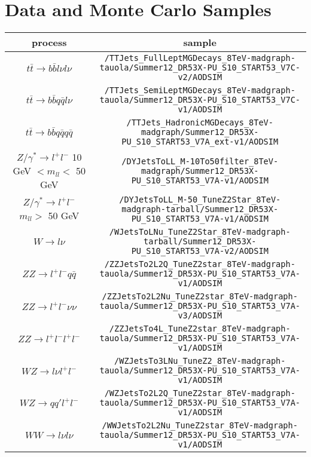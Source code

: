 \chapter{Data and Monte Carlo Samples}


\begin{sidewaystable} 
\small
\begin{tabular}{c|c}
 process & sample \\
\hline 
$t\bar{t} \rightarrow b\bar{b}l\nu l\nu$ & \verb+/TTJets_FullLeptMGDecays_8TeV-madgraph-tauola/Summer12_DR53X-PU_S10_START53_V7C-v2/AODSIM+ \\
$t\bar{t} \rightarrow b\bar{b}q\bar{q}l\nu$ & \verb+/TTJets_SemiLeptMGDecays_8TeV-madgraph-tauola/Summer12_DR53X-PU_S10_START53_V7C-v1/AODSIM+ \\
$t\bar{t} \rightarrow b\bar{b}q\bar{q}q\bar{q}$ & \verb+/TTJets_HadronicMGDecays_8TeV-madgraph/Summer12_DR53X-PU_S10_START53_V7A_ext-v1/AODSIM+ \\
\hline 
$Z/\gamma^{*} \rightarrow l^{+}l^{-}$ 10 GeV $< m_{ll} <$ 50 GeV & \verb+/DYJetsToLL_M-10To50filter_8TeV-madgraph/Summer12_DR53X-PU_S10_START53_V7A-v1/AODSIM+ \\
$Z/\gamma^{*} \rightarrow l^{+}l^{-}$ $m_{ll} >$ 50 GeV & \verb+/DYJetsToLL_M-50_TuneZ2Star_8TeV-madgraph-tarball/Summer12_DR53X-PU_S10_START53_V7A-v1/AODSIM+ \\
\hline 
$W \rightarrow l\nu$ & \verb+/WJetsToLNu_TuneZ2Star_8TeV-madgraph-tarball/Summer12_DR53X-PU_S10_START53_V7A-v2/AODSIM+ \\
\hline 
$ZZ \rightarrow l^{+}l^{-}q\bar{q}$ & \verb+/ZZJetsTo2L2Q_TuneZ2star_8TeV-madgraph-tauola/Summer12_DR53X-PU_S10_START53_V7A-v1/AODSIM+ \\
$ZZ \rightarrow l^{+}l^{-}\nu\nu$ & \verb+/ZZJetsTo2L2Nu_TuneZ2star_8TeV-madgraph-tauola/Summer12_DR53X-PU_S10_START53_V7A-v3/AODSIM+ \\
$ZZ \rightarrow l^{+}l^{-}l^{+}l^{-}$ & \verb+/ZZJetsTo4L_TuneZ2star_8TeV-madgraph-tauola/Summer12_DR53X-PU_S10_START53_V7A-v1/AODSIM+ \\
$WZ \rightarrow l\nu l^{+}l^{-}$ & \verb+/WZJetsTo3LNu_TuneZ2_8TeV-madgraph-tauola/Summer12_DR53X-PU_S10_START53_V7A-v1/AODSIM+ \\
$WZ \rightarrow qq'l^{+}l^{-}$ & \verb+/WZJetsTo2L2Q_TuneZ2star_8TeV-madgraph-tauola/Summer12_DR53X-PU_S10_START53_V7A-v1/AODSIM+ \\
$WW \rightarrow l\nu l\nu$ & \verb+/WWJetsTo2L2Nu_TuneZ2star_8TeV-madgraph-tauola/Summer12_DR53X-PU_S10_START53_V7A-v1/AODSIM+ \\

\end{tabular}
\end{sidewaystable}
